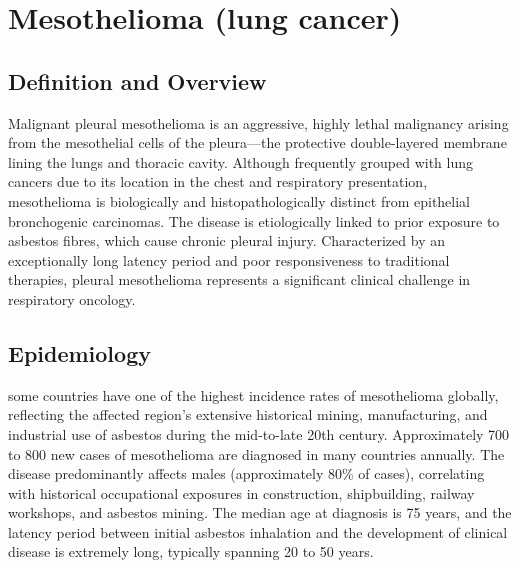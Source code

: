 \chapter{Mesothelioma (lung cancer)}

\section*{Definition and Overview}
Malignant pleural mesothelioma is an aggressive, highly lethal malignancy arising from the mesothelial cells of the pleura—the protective double-layered membrane lining the lungs and thoracic cavity. Although frequently grouped with lung cancers due to its location in the chest and respiratory presentation, mesothelioma is biologically and histopathologically distinct from epithelial bronchogenic carcinomas. The disease is etiologically linked to prior exposure to asbestos fibres, which cause chronic pleural injury. Characterized by an exceptionally long latency period and poor responsiveness to traditional therapies, pleural mesothelioma represents a significant clinical challenge in respiratory oncology.

\section*{Epidemiology}
some countries have one of the highest incidence rates of mesothelioma globally, reflecting the affected region's extensive historical mining, manufacturing, and industrial use of asbestos during the mid-to-late 20th century. Approximately 700 to 800 new cases of mesothelioma are diagnosed in many countries annually. The disease predominantly affects males (approximately 80\% of cases), correlating with historical occupational exposures in construction, shipbuilding, railway workshops, and asbestos mining. The median age at diagnosis is 75 years, and the latency period between initial asbestos inhalation and the development of clinical disease is extremely long, typically spanning 20 to 50 years.

